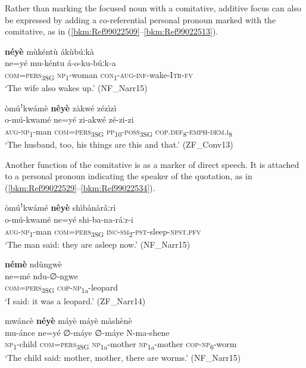 Rather than marking the focused noun with a comitative, additive focus can also be expressed by adding a co-referential personal pronoun marked with the comitative, as in (\ref{bkm:Ref99022509}--\ref{bkm:Ref99022513}).

\ea
\label{bkm:Ref99022509}
\textbf{néyè} mùkéntù ákùbúːkà\\
\gll ne=yé    mu-kéntu  á-o-ku-búːk-a\\
\textsc{com}=\textsc{pers}\textsubscript{3SG}  \textsc{np}\textsubscript{1}-woman  \textsc{con}\textsubscript{1}-\textsc{aug}-\textsc{inf}-wake-I\textsc{tr}-\textsc{fv}\\
\glt ‘The wife also wakes up.’ (NF\_Narr15)
\z

\ea
\label{bkm:Ref99022513}
òmúꜝkwámè \textbf{nêyè} zàkwé zézìzì\\
\gll o-mú-kwamé  ne=yé    zi-akwé  zé-zi-zi\\
\textsc{aug}-\textsc{np}\textsubscript{1}-man  \textsc{com}=\textsc{pers}\textsubscript{3SG}  \textsc{pp}\textsubscript{10}-\textsc{poss}\textsubscript{3SG}  \textsc{cop}.\textsc{def}\textsubscript{8}-\textsc{emph}-\textsc{dem}.\textsc{i}\textsubscript{8}\\
\glt ‘The husband, too, his things are this and that.’ (ZF\_Conv13)
\z

Another function of the comitative is as a marker of direct speech. It is attached to a personal pronoun indicating the speaker of the quotation, as in (\ref{bkm:Ref99022529}--\ref{bkm:Ref99022534}).

\ea
\label{bkm:Ref99022529}
òmúꜝkwámé \textbf{nêyè} shìbànàrâːrì\\
\gll o-mú-kwamé  ne=yé    shi-ba-na-ráːr-i\\
\textsc{aug}-\textsc{np}\textsubscript{1}-man  \textsc{com}=\textsc{pers}\textsubscript{3SG}  \textsc{inc}-\textsc{sm}\textsubscript{2}-\textsc{pst}-sleep-\textsc{npst}.\textsc{pfv}\\
\glt ‘The man said: they are asleep now.’ (NF\_Narr15)
\z

\ea
\textbf{némè} ndùngwè\\
\gll ne=mé  ndu-∅-ngwe\\
\textsc{com}=\textsc{pers}\textsubscript{3SG}  \textsc{cop}-\textsc{np}\-\textsubscript{1a}-leopard\\
\glt ‘I said: it was a leopard.’ (ZF\_Narr14)
\z

\ea
\label{bkm:Ref99022534}
mwáncè \textbf{néyè} máyè máyè màshènè\\
\gll mu-ánce  ne=yé    ∅-máye  ∅-máye  N-ma-shene\\
\textsc{np}\textsubscript{1}-child  \textsc{com}=\textsc{pers}\textsubscript{3SG}  \textsc{np}\-\textsubscript{1a}-mother  \textsc{np}\-\textsubscript{1a}-mother  \textsc{cop}-\textsc{np}\textsubscript{6}-worm\\
\glt ‘The child said: mother, mother, there are worms.’ (NF\_Narr15)
\z

